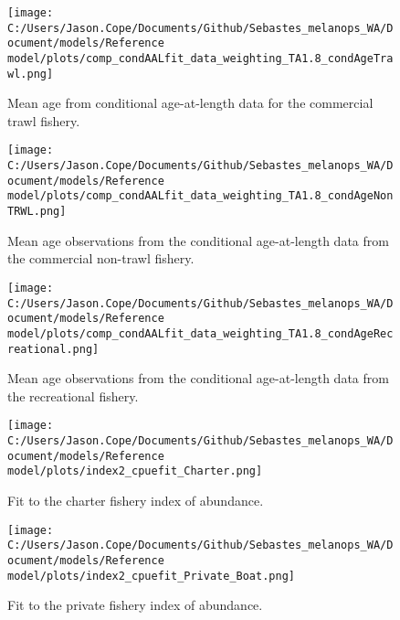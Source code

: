 \documentclass[11pt,
  english,
  letterpaper,
]{article}
\begin{document}
\pagebreak

\begin{figure}
\centering
\texttt{[image: C:/Users/Jason.Cope/Documents/Github/Sebastes\_melanops\_WA/Document/models/Reference model/plots/comp\_condAALfit\_data\_weighting\_TA1.8\_condAgeTrawl.png]}
\caption{Mean age from conditional age-at-length data for the commercial trawl fishery.\label{fig:trawl-mean-caal}}
\end{figure}

\pagebreak

\begin{figure}
\centering
\texttt{[image: C:/Users/Jason.Cope/Documents/Github/Sebastes\_melanops\_WA/Document/models/Reference model/plots/comp\_condAALfit\_data\_weighting\_TA1.8\_condAgeNonTRWL.png]}
\caption{Mean age observations from the conditional age-at-length data from the commercial non-trawl fishery.\label{fig:nontrawl-mean-caal}}
\end{figure}

\pagebreak

\begin{figure}
\centering
\texttt{[image: C:/Users/Jason.Cope/Documents/Github/Sebastes\_melanops\_WA/Document/models/Reference model/plots/comp\_condAALfit\_data\_weighting\_TA1.8\_condAgeRecreational.png]}
\caption{Mean age observations from the conditional age-at-length data from the recreational fishery.\label{fig:rec-mean-caal}}
\end{figure}

\pagebreak

\begin{figure}
\centering
\texttt{[image: C:/Users/Jason.Cope/Documents/Github/Sebastes\_melanops\_WA/Document/models/Reference model/plots/index2\_cpuefit\_Charter.png]}
\caption{Fit to the charter fishery index of abundance.\label{fig:charter-index-fit}}
\end{figure}

\pagebreak

\begin{figure}
\centering
\texttt{[image: C:/Users/Jason.Cope/Documents/Github/Sebastes\_melanops\_WA/Document/models/Reference model/plots/index2\_cpuefit\_Private\_Boat.png]}
\caption{Fit to the private fishery index of abundance.\label{fig:private-index-fit}}
\end{figure}
\end{document}
